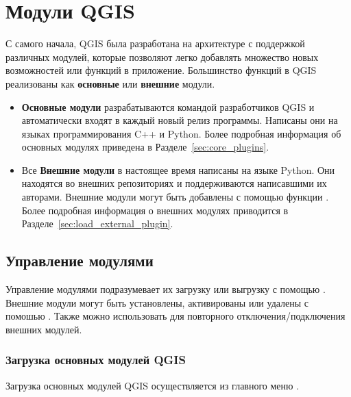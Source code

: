 
\chapter{Модули QGIS}\label{sec:plugins}


С самого начала, QGIS была разработана на архитектуре с поддержкой различных
модулей, которые позволяют легко добавлять множество новых возможностей
или функций в приложение. Большинство функций в QGIS реализованы как
\textbf{основные} или \textbf{внешние} модули.

\begin{itemize}[label=--]
\item \textbf{Основные модули} разрабатываются командой разработчиков
QGIS и автоматически входят в каждый новый релиз программы. Написаны они
на языках программирования C++ и Python. Более подробная информация
об основных модулях приведена в Разделе~\ref{sec:core_plugins}.
\item Все \textbf{Внешние модули} в настоящее время написаны на языке
Python. Они находятся во внешних репозиториях и поддерживаются
написавшими их авторами. Внешние модули могут быть добавлены с помощью
функции . Более подробная информация
о внешних модулях приводится в Разделе~\ref{sec:load_external_plugin}.
\end{itemize}

\section{Управление модулями}\label{sec:managing_plugins}

Управление модулями подразумевает их загрузку или выгрузку с помощью
. Внешние модули могут быть установлены,
активированы или удалены с помошью .
Также  можно использовать для повторного
отключения/подключения внешних модулей.

\subsection{Загрузка основных модулей QGIS}\label{sec:load_core_plugin}

Загрузка основных модулей QGIS осуществляется из главного меню
 \arrow
{}.

